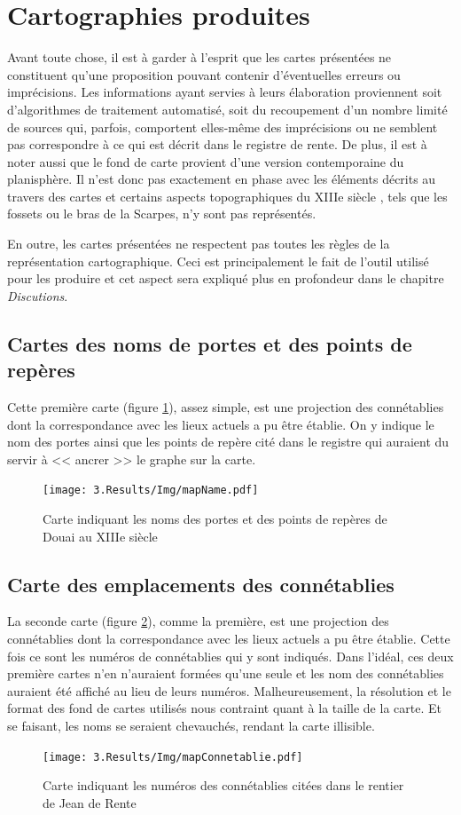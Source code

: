 \section{Cartographies produites}
Avant toute chose, il est à garder à l'esprit que les cartes présentées ne constituent qu'une proposition pouvant contenir d'éventuelles erreurs ou imprécisions. Les informations ayant servies à leurs élaboration proviennent soit d'algorithmes de traitement automatisé, soit du recoupement d'un nombre limité de sources qui, parfois, comportent elles-même des imprécisions ou ne semblent pas correspondre à ce qui est décrit dans le registre de rente.
De plus, il est à noter aussi que le fond de carte provient d'une version contemporaine du planisphère. Il n'est donc pas exactement en phase avec les éléments décrits au travers des cartes et certains aspects topographiques du XIIIe siècle , tels que les fossets ou le bras de la Scarpes,  n'y sont pas représentés. 

En outre, les cartes présentées ne respectent pas toutes les règles de la représentation cartographique. Ceci est principalement le fait de l'outil utilisé pour les produire et cet aspect sera expliqué plus en profondeur dans le
chapitre \textit{Discutions}.
\subsection{Cartes des noms de portes et des points de repères}
Cette première carte (figure \ref{fig:mapName}), assez simple, est une projection des connétablies dont la correspondance avec les lieux actuels a pu être établie. On y indique le nom des portes ainsi que les points de repère cité dans le registre qui auraient du servir à << ancrer >> le graphe sur la carte.
\begin{figure}
    \centering
    \texttt{[image: 3.Results/Img/mapName.pdf]}
    \caption{Carte indiquant les noms des portes et des points de repères de Douai au XIIIe siècle}
    \label{fig:mapName}
\end{figure}
\subsection{Carte des emplacements des connétablies}
La seconde carte (figure \ref{fig:mapConnetablie}), comme la première,  est une projection des connétablies dont la correspondance avec les lieux actuels a pu être établie. Cette fois  ce sont les numéros de connétablies qui y sont indiqués. Dans l'idéal, ces deux première cartes n'en n'auraient formées qu'une seule et les nom des connétablies auraient été affiché au lieu de leurs numéros. Malheureusement, la résolution et le format des fond de cartes utilisés nous contraint quant à la taille de la carte. Et se faisant, les noms se seraient chevauchés, rendant la carte illisible.
\begin{figure}
    \centering
    \texttt{[image: 3.Results/Img/mapConnetablie.pdf]}
    \caption{Carte indiquant les numéros des connétablies citées dans le rentier de Jean de Rente}
    \label{fig:mapConnetablie}
\end{figure}


